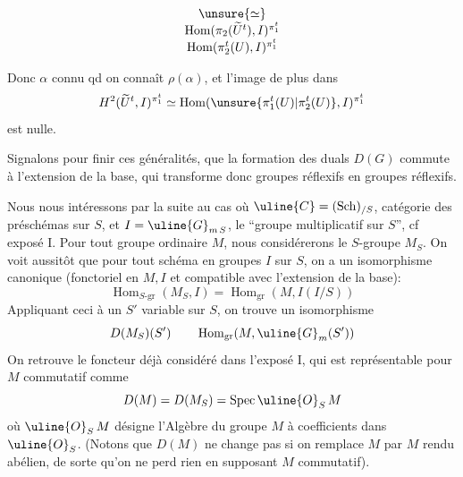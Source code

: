 \[
\begin{array}{c}
\unsure{\simeq}\\
\operatorname{Hom}(\pi_2(\widetilde U^t),I)^{\pi_1^t}\\
\operatorname{Hom}(\pi_2^t(U),I)^{\pi_1^t}
\end{array}
\]

Donc $\alpha$ connu qd on connaît
$\rho(\alpha)$, et l'image de plus dans
\[
H^2(\widetilde U^t,I)^{\pi_1^t}
\simeq\operatorname{Hom}(\unsure{\pi_1^t(U)|\pi_2^t(U)},I)^{\pi_1^t}
\]
est nulle.

Signalons pour finir ces généralités, que la formation des duals
$D(G)$ commute à l'extension de la base, qui transforme donc groupes
réflexifs en groupes réflexifs.

Nous nous intéressons par la suite au cas où
$\uline{C}=(\mathrm{Sch})_{/S}$, catégorie
des préschémas sur $S$, et $I=\uline{G}_{m\,S}$,
le ``groupe multiplicatif sur $S$'',
cf exposé I. Pour tout groupe  ordinaire $M$, nous considérerons
le $S$-groupe $M_S$. On voit aussitôt que pour tout schéma en groupes
$I$ sur $S$, on a un isomorphisme canonique
(fonctoriel en $M,I$ et compatible avec l'extension de la base):
\[
\operatorname{Hom}_{S\text{-gr}}(M_S,I)
=\operatorname{Hom}_{\mathrm{gr}}(M,I(I/S))
\]
Appliquant ceci à un $S'$ variable sur $S$, on trouve un isomorphisme
\[
D(M_S)(S')\qquad\operatorname{Hom}_{\mathrm{gr}}(M,\uline{G}_m(S'))
\]
On retrouve le foncteur déjà considéré dans l'exposé I,
qui est représentable 
pour $M$ commutatif comme
\[
D(M)=D(M_S)=\operatorname{Spec}\uline{O}_S\,M
\]
où $\uline{O}_S\,M$ désigne l'Algèbre du groupe $M$ à coefficients dans
$\uline{O}_S$. (Notons
que $D(M)$ ne change pas si on remplace $M$ par $M$ rendu
abélien, de sorte 
qu'on ne perd rien en supposant $M$ commutatif).

